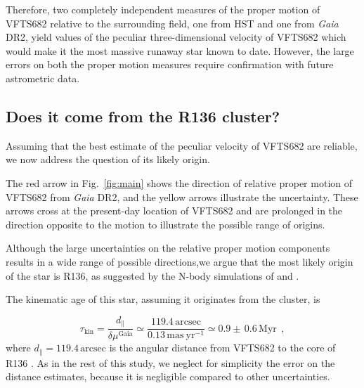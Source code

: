 \documentclass[apjl,twocolumn]{emulateapj}
\DeclareRobustCommand{\Eqref}[1]{Eq.~\ref{#1}}
\DeclareRobustCommand{\Figref}[1]{Fig.~\ref{#1}}
\begin{document}
Therefore, two completely independent measures of the proper motion of
VFTS682 relative to the surrounding field, one from HST and one from
\emph{Gaia} DR2, yield values of the peculiar three-dimensional
velocity of VFTS682 %
which would make it the most massive runaway star
known to date. However, the large errors on both the proper motion measures
require confirmation with future astrometric data. 

\subsection{Does it come from the R136 cluster?}
\label{sec:r136_origin}

Assuming that the best estimate of the peculiar velocity of VFTS682
are reliable, we now address the question of its likely origin.

The red arrow in \Figref{fig:main} shows the direction of relative proper motion of
VFTS682 from \emph{Gaia} DR2, and the
yellow arrows illustrate the uncertainty. %
These arrows cross at the present-day location of VFTS682 and
are prolonged in the direction opposite to the motion to illustrate
the possible range of origins. %

Although the large uncertainties on the relative proper motion
components results in a wide range of possible directions,we argue that the most likely origin of the star is R136,
as suggested by the N-body simulations of \cite{fujii:11}
and \cite{banerjee:12}.

The kinematic age of this star, assuming it originates from the
cluster, is

\begin{equation}
  \label{eq:kin_age}
  \tau_\mathrm{kin} = \frac{d_\parallel}{\delta\mu^\mathrm{Gaia}} \simeq
  \frac{119.4\,\mathrm{arcsec}}{0.13\,\mathrm{mas\ yr^{-1}}} \simeq 0.9\pm\,0.6\, \mathrm{Myr} \ \ ,
\end{equation}
where $d_\parallel = 119.4\,\mathrm{arcsec}$ is the angular distance from VFTS682 to
the core of R136 \citep[corresponding to $\sim$29\,pc at LMC distance,][]{bestenlehner:11}.
As in the rest of this study, we neglect for
simplicity the error on the distance estimates, because it is negligible compared to other uncertainties.
\end{document}
